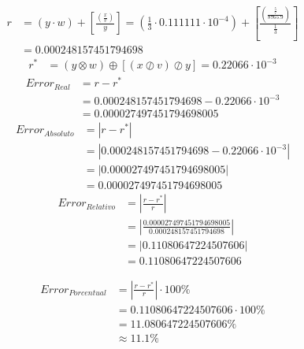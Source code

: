 \documentclass[12pt]{article}
\begin{document}
\begin{enumerate}
    \[  
    \begin{aligned}
        r &= (y \cdot w) + \left[\frac{(\frac{x}{v})}{y}\right] = (\frac{1}{3} \cdot 0.111111 \cdot 10^{-4} ) + \left[\frac{(\frac{\frac{5}{7}}{8765.9})}{\frac{1}{3}}\right]\\
          &=0.000248157451794698
    \end{aligned}
    \]
    \[  
    \begin{aligned}
        r^{*} &=(y \otimes w) \oplus [(x \oslash v) \oslash y] = 0.22066 \cdot 10^{-3}
    \end{aligned}
    \]
    \[
    \begin{aligned}
        Error_{Real} &= r - r^{*}\\
                     &= 0.000248157451794698 - 0.22066 \cdot 10^{-3}\\
                     &= 0.000027497451794698005
    \end{aligned}
    \]
    \[
        \begin{aligned}
            Error_{Absoluto} &= |r - r^{*}|\\
                         &= |0.000248157451794698 - 0.22066 \cdot 10^{-3}|\\
                         &= |0.000027497451794698005|\\
                         &= 0.000027497451794698005
        \end{aligned}
    \]
    \[
        \begin{aligned}
            Error_{Relativo} &= \left| \frac{r - r^{*}}{r}\right|\\
                         &= \left| \frac{0.000027497451794698005}{0.000248157451794698}\right|\\
                         &= |0.11080647224507606|\\
                         &= 0.11080647224507606
        \end{aligned}
    \]

    \[
        \begin{aligned}
            Error_{Porcentual} &= \left| \frac{r - r^{*}}{r}\right| \cdot 100\%\\
                         &= 0.11080647224507606 \cdot 100\%\\
                         &= 11.080647224507606\%\\
                         &\approx 11.1\%
        \end{aligned}
    \]
\end{enumerate}


%
%
\end{document}
